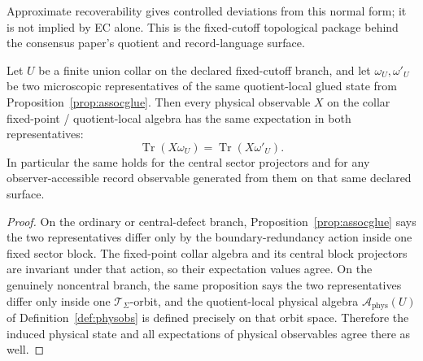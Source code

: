 \begin{remark}
Approximate recoverability gives controlled deviations from this normal form; it is not implied by
EC alone. This is the fixed-cutoff topological package behind the consensus paper's quotient and
record-language surface.
\end{remark}

\begin{corollary}\label{cor:obsglue}
Let \(U\) be a finite union collar on the declared fixed-cutoff branch, and let
\(\omega_U,\omega'_U\) be two microscopic representatives of the same quotient-local glued state
from Proposition~\ref{prop:assocglue}. Then every physical observable \(X\) on the collar
fixed-point / quotient-local algebra has the same expectation in both representatives:
\[
\operatorname{Tr}(X\omega_U)=\operatorname{Tr}(X\omega'_U).
\]
In particular the same holds for the central sector projectors and for any observer-accessible
record observable generated from them on that same declared surface.
\end{corollary}

\begin{proof}
On the ordinary or central-defect branch, Proposition~\ref{prop:assocglue} says the two
representatives differ only by the boundary-redundancy action inside one fixed sector block. The
fixed-point collar algebra and its central block projectors are invariant under that action, so
their expectation values agree. On the genuinely noncentral branch, the same proposition says the
two representatives differ only inside one \(\mathcal T_\Sigma\)-orbit, and the quotient-local
physical algebra \(\mathcal A_{\mathrm{phys}}(U)\) of Definition~\ref{def:physobs} is defined
precisely on that orbit space. Therefore the induced physical state and all expectations of
physical observables agree there as well.
\end{proof}
